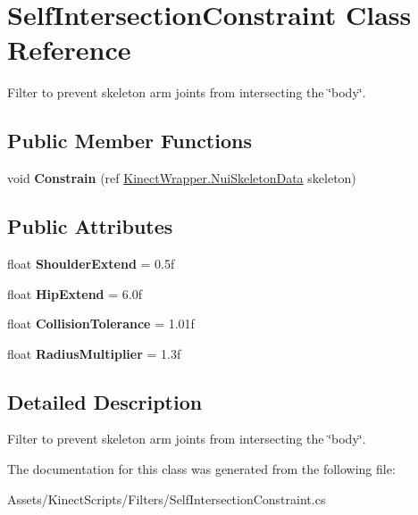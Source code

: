 \hypertarget{class_self_intersection_constraint}{}\section{Self\+Intersection\+Constraint Class Reference}
\label{class_self_intersection_constraint}


Filter to prevent skeleton arm joints from intersecting the \char`\"{}body\char`\"{}.  


\subsection*{Public Member Functions}
\begin{DoxyCompactItemize}
\item 
\mbox{\label{class_self_intersection_constraint_acf147bb20faea4fac58dc6f593588f44}} 
void {\bfseries Constrain} (ref \mbox{\hyperlink{struct_kinect_wrapper_1_1_nui_skeleton_data}{Kinect\+Wrapper.\+Nui\+Skeleton\+Data}} skeleton)
\end{DoxyCompactItemize}
\subsection*{Public Attributes}
\begin{DoxyCompactItemize}
\item 
\mbox{\label{class_self_intersection_constraint_aa52dfc3119a99cd2cd5ef160906dcaa5}} 
float {\bfseries Shoulder\+Extend} = 0.\+5f
\item 
\mbox{\label{class_self_intersection_constraint_ac723559a2cd2b3f563b5b857b1357299}} 
float {\bfseries Hip\+Extend} = 6.\+0f
\item 
\mbox{\label{class_self_intersection_constraint_ac32f587ce2268e124021335b5d4d5338}} 
float {\bfseries Collision\+Tolerance} = 1.\+01f
\item 
\mbox{\label{class_self_intersection_constraint_ac204dc28ae0a8e00165e46d64f4a5c78}} 
float {\bfseries Radius\+Multiplier} = 1.\+3f
\end{DoxyCompactItemize}


\subsection{Detailed Description}
Filter to prevent skeleton arm joints from intersecting the \char`\"{}body\char`\"{}. 



The documentation for this class was generated from the following file\+:\begin{DoxyCompactItemize}
\item 
Assets/\+Kinect\+Scripts/\+Filters/Self\+Intersection\+Constraint.\+cs\end{DoxyCompactItemize}
